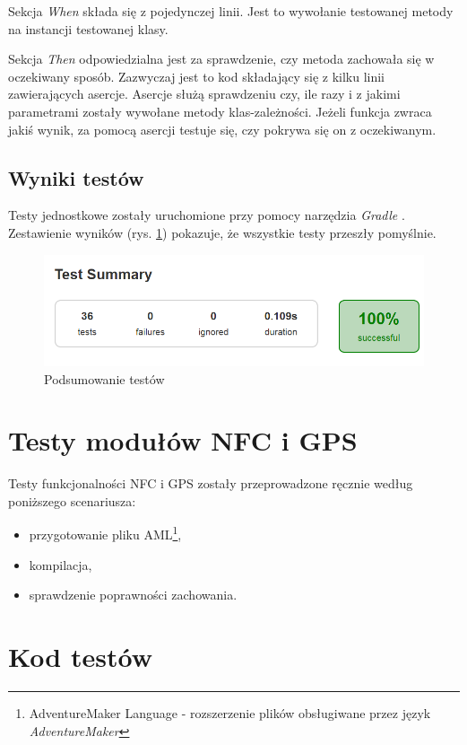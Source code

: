\documentclass[openright]{xmgr}
\begin{document}
Sekcja \textit{When} składa się z pojedynczej linii. Jest to wywołanie testowanej metody na instancji testowanej klasy.

Sekcja \textit{Then} odpowiedzialna jest za sprawdzenie, czy metoda zachowała się w oczekiwany sposób. Zazwyczaj jest to kod składający się z kilku linii zawierających asercje. Asercje służą sprawdzeniu czy, ile razy i z jakimi parametrami zostały wywołane metody klas-zależności. Jeżeli funkcja zwraca jakiś wynik, za pomocą asercji testuje się, czy pokrywa się on z oczekiwanym.

\subsection{Wyniki testów}
Testy jednostkowe zostały uruchomione przy pomocy narzędzia \textit{Gradle} \cite{Gradle:2017:Doc}. Zestawienie wyników (rys. \ref{tests:results}) pokazuje, że wszystkie testy przeszły pomyślnie.

\begin{figure}[!tbh]
	\centering
	\includegraphics[width=1.0\hsize]{fig/test_summary}
	\caption{Podsumowanie testów}
	\label{tests:results}
\end{figure}

\section{Testy modułów NFC i GPS}

Testy funkcjonalności NFC i GPS zostały przeprowadzone ręcznie według poniższego scenariusza:

\begin{itemize}
  \item przygotowanie pliku AML\footnote{AdventureMaker Language - rozszerzenie plików obsługiwane przez język \textit{AdventureMaker}},
  \item kompilacja,
  \item sprawdzenie poprawności zachowania.
\end{itemize}

\section{Kod testów}
\end{document}
